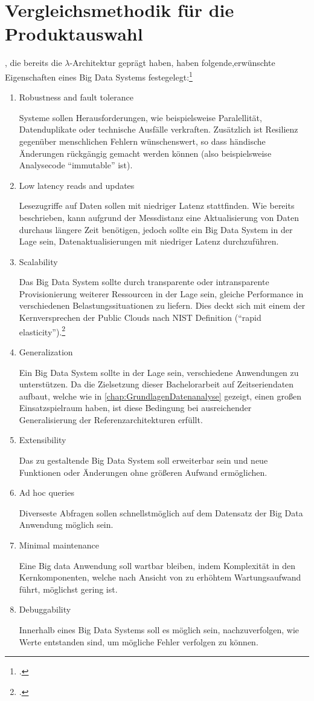 \section{Vergleichsmethodik für die Produktauswahl}\label{chap:vergleichsmethodik}

\citeauthor{Marz.2015}, die bereits die $\lambda$-Architektur geprägt haben, haben folgende,erwünschte Eigenschaften eines Big Data Systems festegelegt:\footcite[Vgl.][7\psqq]{Marz.2015}
\begin{enumerate}
\item Robustness and fault tolerance

Systeme sollen Herausforderungen, wie beispielsweise Paralellität, Datenduplikate oder technische Ausfälle verkraften. Zusätzlich ist Resilienz gegenüber menschlichen Fehlern wünschenswert, so dass händische Änderungen rückgängig gemacht werden können (also beispielsweise Analysecode \enquote{immutable} ist).
\item Low latency reads and updates

Lesezugriffe auf Daten sollen mit niedriger Latenz stattfinden. Wie bereits beschrieben, kann aufgrund der Messdistanz eine Aktualisierung von Daten durchaus längere Zeit benötigen, jedoch sollte ein Big Data System in der Lage sein, Datenaktualisierungen mit niedriger Latenz durchzuführen.
\item Scalability

Das Big Data System sollte durch transparente oder intransparente Provisionierung weiterer Ressourcen in der Lage sein, gleiche Performance in verschiedenen Belastungssituationen zu liefern. Dies deckt sich mit einem der Kernversprechen der Public Clouds nach NIST Definition (\enquote{rapid elasticity}).\footcite[Vgl.][2]{Mell.2011}
\item Generalization

Ein Big Data System sollte in der Lage sein, verschiedene Anwendungen zu unterstützen. Da die Zielsetzung dieser Bachelorarbeit auf Zeitseriendaten aufbaut, welche wie in \autoref{chap:GrundlagenDatenanalyse} gezeigt, einen großen Einsatzspielraum haben, ist diese Bedingung bei ausreichender Generalisierung der Referenzarchitekturen erfüllt.
\item Extensibility

Das zu gestaltende Big Data System soll erweiterbar sein und neue Funktionen oder Änderungen ohne größeren Aufwand ermöglichen.
\item Ad hoc queries

Diverseste Abfragen sollen schnellstmöglich auf dem Datensatz der Big Data Anwendung möglich sein.
\item Minimal maintenance

Eine Big data Anwendung soll wartbar bleiben, indem Komplexität in den Kernkomponenten, welche nach Ansicht von \citeauthor{Marz.2015} zu erhöhtem Wartungsaufwand führt, möglichst gering ist.
\item Debuggability

Innerhalb eines Big Data Systems soll es möglich sein, nachzuverfolgen, wie Werte entstanden sind, um mögliche Fehler verfolgen zu können.
\end{enumerate}

